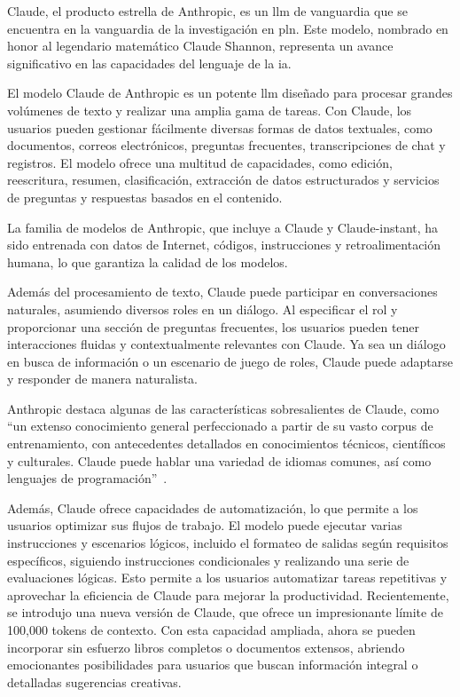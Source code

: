 Claude, el producto estrella de Anthropic, es un \acrlong{llm} de vanguardia que se encuentra en la vanguardia de la investigación en \acrlong{pln}. Este modelo, nombrado en honor al legendario matemático Claude Shannon, representa un avance significativo en las capacidades del lenguaje de la \acrshort{ia}. 

El modelo Claude de Anthropic es un potente \acrshort{llm} diseñado para procesar grandes volúmenes de texto y realizar una amplia gama de tareas. Con Claude, los usuarios pueden gestionar fácilmente diversas formas de datos textuales, como documentos, correos electrónicos, preguntas frecuentes, transcripciones de chat y registros. El modelo ofrece una multitud de capacidades, como edición, reescritura, resumen, clasificación, extracción de datos estructurados y servicios de preguntas y respuestas basados en el contenido.

La familia de modelos de Anthropic, que incluye a Claude y Claude-instant, ha sido entrenada con datos de Internet, códigos, instrucciones y retroalimentación humana, lo que garantiza la calidad de los modelos.

Además del procesamiento de texto, Claude puede participar en conversaciones naturales, asumiendo diversos roles en un diálogo. Al especificar el rol y proporcionar una sección de preguntas frecuentes, los usuarios pueden tener interacciones fluidas y contextualmente relevantes con Claude. Ya sea un diálogo en busca de información o un escenario de juego de roles, Claude puede adaptarse y responder de manera naturalista.

Anthropic destaca algunas de las características sobresalientes de Claude, como ``un extenso conocimiento general perfeccionado a partir de su vasto corpus de entrenamiento, con antecedentes detallados en conocimientos técnicos, científicos y culturales. Claude puede hablar una variedad de idiomas comunes, así como lenguajes de programación''~\cite{Anthropic}.

Además, Claude ofrece capacidades de automatización, lo que permite a los usuarios optimizar sus flujos de trabajo. El modelo puede ejecutar varias instrucciones y escenarios lógicos, incluido el formateo de salidas según requisitos específicos, siguiendo instrucciones condicionales y realizando una serie de evaluaciones lógicas. Esto permite a los usuarios automatizar tareas repetitivas y aprovechar la eficiencia de Claude para mejorar la productividad. Recientemente, se introdujo una nueva versión de Claude, que ofrece un impresionante límite de 100,000 tokens de contexto. Con esta capacidad ampliada, ahora se pueden incorporar sin esfuerzo libros completos o documentos extensos, abriendo emocionantes posibilidades para usuarios que buscan información integral o detalladas sugerencias creativas.


